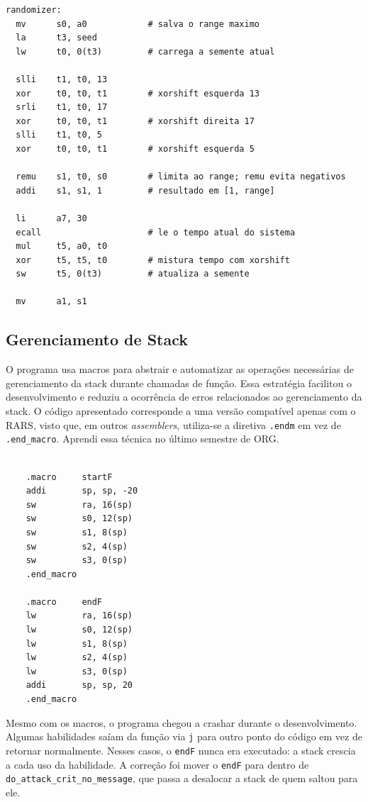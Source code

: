 \documentclass[AMA,twocolumn]{USG}
\begin{document}
\begin{verbatim}
randomizer:
  mv      s0, a0            # salva o range maximo
  la      t3, seed
  lw      t0, 0(t3)         # carrega a semente atual

  slli    t1, t0, 13
  xor     t0, t0, t1        # xorshift esquerda 13
  srli    t1, t0, 17
  xor     t0, t0, t1        # xorshift direita 17
  slli    t1, t0, 5
  xor     t0, t0, t1        # xorshift esquerda 5

  remu    s1, t0, s0        # limita ao range; remu evita negativos
  addi    s1, s1, 1         # resultado em [1, range]

  li      a7, 30
  ecall                     # le o tempo atual do sistema
  mul     t5, a0, t0
  xor     t5, t5, t0        # mistura tempo com xorshift
  sw      t5, 0(t3)         # atualiza a semente

  mv      a1, s1
\end{verbatim}

\subsection{Gerenciamento de Stack}

O programa usa macros para abstrair e automatizar as operações necessárias de gerenciamento da stack
durante chamadas de função. Essa estratégia facilitou o desenvolvimento e reduziu a ocorrência de erros
relacionados ao gerenciamento da stack. O código apresentado corresponde a uma versão compatível apenas 
com o RARS, visto que, em outros \textit{assemblers}, utiliza-se a diretiva \texttt{.endm} 
em vez de \texttt{.end\_macro}. Aprendi essa técnica no último semestre de ORG.
\\\\

\begin{verbatim}
    .macro     startF
    addi       sp, sp, -20
    sw         ra, 16(sp)
    sw         s0, 12(sp)
    sw         s1, 8(sp)
    sw         s2, 4(sp)
    sw         s3, 0(sp)
    .end_macro

    .macro     endF
    lw         ra, 16(sp)
    lw         s0, 12(sp)
    lw         s1, 8(sp)
    lw         s2, 4(sp)
    lw         s3, 0(sp)
    addi       sp, sp, 20
    .end_macro

\end{verbatim}
Mesmo com os macros, o programa chegou a crashar durante o desenvolvimento. 
Algumas habilidades saíam da função via \texttt{j} para outro ponto do código 
em vez de retornar normalmente. Nesses casos, o \texttt{endF} nunca era executado: 
a stack crescia a cada uso da habilidade. A correção foi mover o \texttt{endF} para dentro de
\texttt{do\_attack\_crit\_no\_message}, que passa a desalocar a stack de quem saltou para ele.
\end{document}
